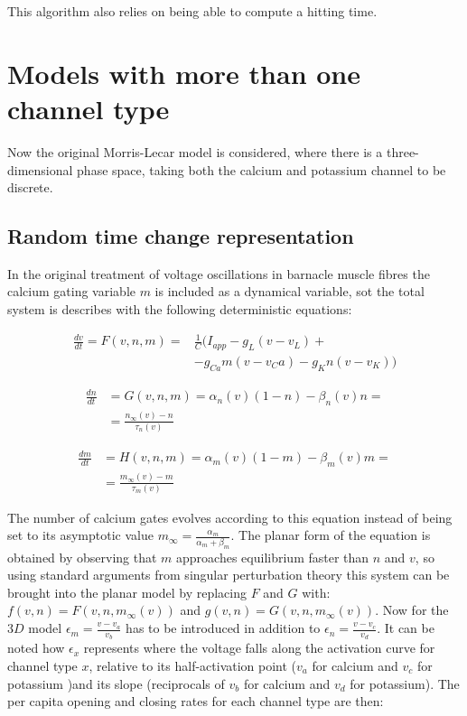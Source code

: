		

		This algorithm also relies on being able to compute a hitting time.



\section{Models with more than one channel type}
Now the original Morris-Lecar model is considered, where there is a three-dimensional phase space, taking both the calcium and potassium channel to be discrete.

	\subsection{Random time change representation}
	In the original treatment of voltage oscillations  in barnacle muscle fibres the calcium gating variable $m$ is included as a dynamical variable, sot the total system is describes with the following deterministic equations:


	\begin{align*}
		\frac{dv}{dt} = F(v, n, m) =&\frac{1}{C}(I_{app}-g_L(v-v_L)+\\
																&-g_{Ca}m(v-v_Ca)-g_Kn(v-v_K))
	\end{align*}

	\begin{align*}
		\frac{dn}{dt} &= G(v, n, m) = \alpha_n(v)(1-n)-\beta_n(v)n=\\
									&=\frac{n_{\infty}(v)-n}{\tau_n(v)}
	\end{align*}

	\begin{align*}
		\frac{dm}{dt} &= H(v, n, m) = \alpha_m(v)(1-m)-\beta_m(v)m=\\
									&=\frac{m_\infty(v)-m}{\tau_m(v)}
	\end{align*}

	The number of calcium gates evolves according to this equation instead of being set to its asymptotic value $m_\infty = \frac{\alpha_m}{\alpha_m+\beta_m}$.
	The planar form of the equation is obtained by observing that $m$ approaches equilibrium faster than $n$ and $v$, so using standard arguments from singular perturbation theory this system can be brought into the planar model by replacing $F$ and $G$ with: $f(v, n) = F(v, n, m_\infty(v))$ and $g(v, n) = G(v, n, m_\infty(v))$.
	Now for the $3D$ model $\epsilon_m = \frac{v-v_a}{v_b}$ has to be introduced in addition to $\epsilon_n = \frac{v-v_c}{v_d}$.
	It can be noted how $\epsilon_x$ represents where the voltage falls along the activation curve for channel type $x$, relative to its half-activation point ($v_a$ for calcium and $v_c$ for potassium )and its slope (reciprocals of $v_b$ for calcium and $v_d$ for potassium).
	The per capita opening and closing rates for each channel type are then:

